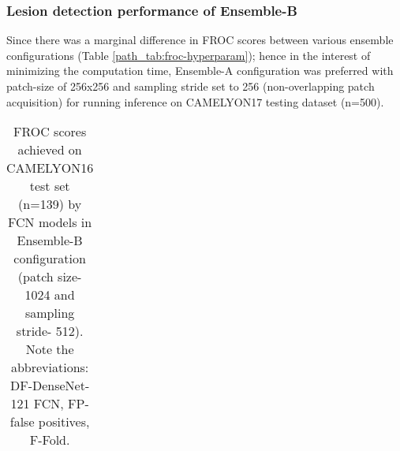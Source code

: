 \documentclass[times,twocolumn,final,authoryear]{tmp}
\begin{document}
\subsubsection{Lesion detection performance of Ensemble-B}
\label{path_sec:Ens-B-perform}

Since there was a marginal difference in FROC scores between various ensemble configurations (Table \ref{path_tab:froc-hyperparam}); hence in the interest of minimizing the computation time, Ensemble-A configuration was preferred with patch-size of 256x256 and sampling stride set to 256 (non-overlapping patch acquisition) for running inference on CAMELYON17 testing dataset (n=500). 

\begin{table}[!h]
\centering
\caption{FROC scores achieved on CAMELYON16 test set (n=139) by FCN models in Ensemble-B configuration (patch size- 1024 and sampling stride- 512). Note the abbreviations: DF-DenseNet-121 FCN, FP-false positives, F-Fold.}
\label{path_tab:EnsB-FROC}
\begin{tabular}{@{}lllll@{}}
  

\end{tabular}
\end{table}
\end{document}
